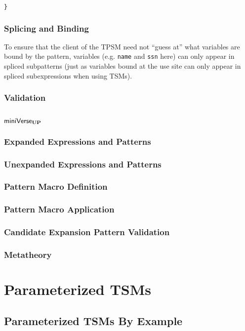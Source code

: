 {\begin{lstlisting}[numbers=none]
}
\end{lstlisting}


\subsection{Splicing and Binding}\label{sec:ptsms-splicing}
To ensure that the client of the TPSM need not ``guess at'' what variables are bound by the pattern, variables (e.g. \lstinline{name} and \lstinline{ssn} here) can only appear in spliced subpatterns (just as variables bound at the use site can only appear in spliced subexpressions when using TSMs). 


\subsection{Validation}\label{sec:ptsms-validation}

\section{$\mathsf{miniVerse}_\textbf{UP}$}\label{sec:miniVerseUP}
\subsection{Expanded Expressions and Patterns}
\subsection{Unexpanded Expressions and Patterns}
\subsection{Pattern Macro Definition}
\subsection{Pattern Macro Application}
\subsection{Candidate Expansion Pattern Validation}
\subsection{Metatheory}

\chapter{Parameterized TSMs}\label{sec:tsms-parameterized}
\section{Parameterized TSMs By Example}
}
